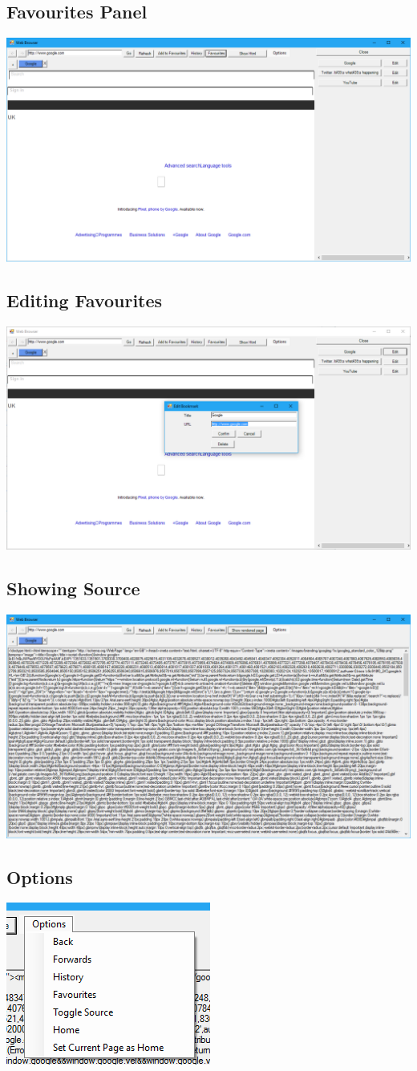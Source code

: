 \documentclass[11pt]{report}
\begin{document}
\subsection{Favourites Panel}
\includegraphics[scale=0.4]{favourites.png}
\subsection{Editing Favourites}
\includegraphics[scale=0.4]{edit-favourites.png}
\subsection{Showing Source}
\includegraphics[scale=0.4]{source.png}
\subsection{Options}
\includegraphics[scale=1]{options.png}
\end{document}
